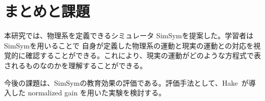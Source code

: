 \documentclass[11pt, a4paper, oneside, twocolumn, dvipdfmx]{jsarticle}
\newcommand{\simname}{SimSym}
\begin{document}


\section{まとめと課題}
本研究では、物理系を定義できるシミュレータ \simname を提案した。学習者は\simname を用いることで
自身が定義した物理系の運動と現実の運動との対応を視覚的に確認することができる。これにより、現実の運動がどのような方程式で表されるものなのかを理解することができる。

今後の課題は、\simname の教育効果の評価である。評価手法として、Hake~\cite{hake_1998}が導入した normalized gain を用いた実験を検討する。


\tiny{}
\end{document}
